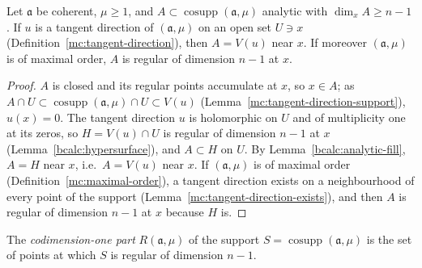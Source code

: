\begin{lemma}
\label{bcalc:codim-one-local}
\upstreamleanok
Let \(\mathfrak a\) be coherent, \(\mu\ge1\), and \(A\subset\operatorname{cosupp}(\mathfrak a,\mu)\) analytic with \(\dim_xA\ge n-1\). If \(u\) is a tangent
direction of \((\mathfrak a,\mu)\) on an open set \(U\ni x\) (Definition~\ref{mc:tangent-direction}), then \(A=V(u)\) near \(x\). If moreover
\((\mathfrak a,\mu)\) is of maximal order, \(A\) is regular of dimension \(n-1\) at \(x\).
\end{lemma}
\begin{proof}
\upstreamleanok
\(A\) is closed and its regular points accumulate at \(x\), so \(x\in A\); as \(A\cap U\subset\operatorname{cosupp}(\mathfrak a,\mu)\cap U\subset V(u)\)
(Lemma~\ref{mc:tangent-direction-support}), \(u(x)=0\). The tangent direction \(u\) is holomorphic on \(U\) and of multiplicity one at its zeros, so
\(H=V(u)\cap U\) is regular of dimension \(n-1\) at \(x\) (Lemma~\ref{bcalc:hypersurface}), and \(A\subset H\) on \(U\). By
Lemma~\ref{bcalc:analytic-fill}, \(A=H\) near \(x\), i.e.\ \(A=V(u)\) near \(x\). If \((\mathfrak a,\mu)\) is of maximal order
(Definition~\ref{mc:maximal-order}), a tangent direction exists on a neighbourhood of every point of the support
(Lemma~\ref{mc:tangent-direction-exists}), and then \(A\) is regular of dimension \(n-1\) at \(x\) because \(H\) is.
\end{proof}

\begin{definition}
\label{bcalc:codim-one-part-def}
\upstreamleanok
The \emph{codimension-one part} \(R(\mathfrak a,\mu)\) of the support \(S=\operatorname{cosupp}(\mathfrak a,\mu)\) is the set of points at which \(S\) is
regular of dimension \(n-1\).
\end{definition}

